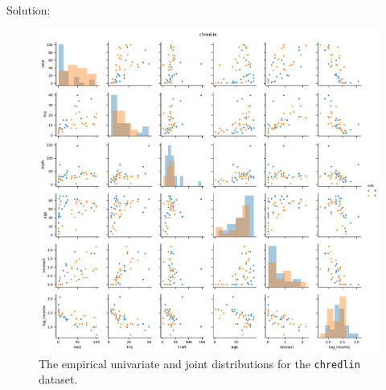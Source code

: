 \documentclass[letterpaper,11pt]{article}
\begin{document}
\begin{enumerate}
\begin{enumerate}
\begin{enumerate}
      \begin{description}
      \item[Solution:] 
      \end{description}
    \end{enumerate}
  \end{enumerate}
\end{enumerate}

\begin{figure}
  \centering
  \includegraphics[width=\textwidth]{p1_pair_plots.pdf}
  \caption{The empirical univariate and joint distributions for the
    \texttt{chredlin} dataset.}
  \label{fig:p1_pair_plots}
\end{figure}
\end{document}
